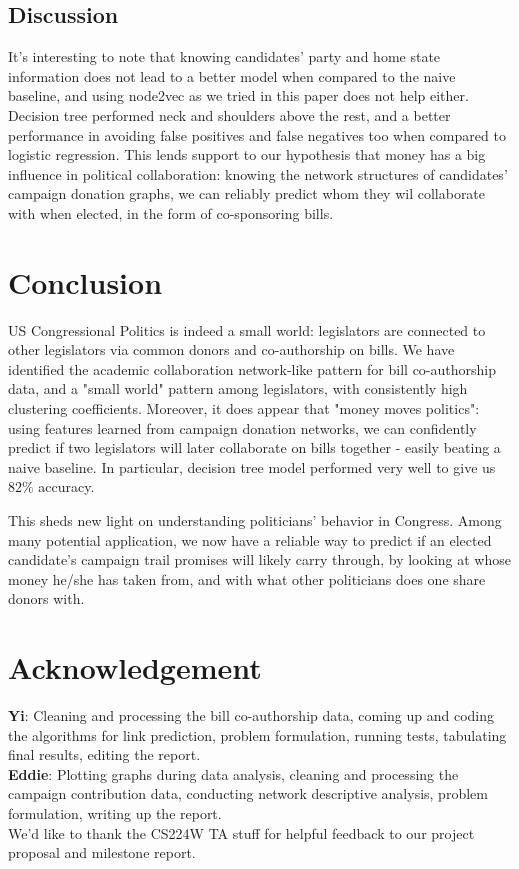 \documentclass[12pt,twocolumn]{article}
\begin{document}
\subsection{Discussion}
It's interesting to note that knowing candidates' party and home state information does not lead to a better model when compared to the naive baseline, and using node2vec as we tried in this paper does not help either. Decision tree performed neck and shoulders above the rest, and a better performance in avoiding false positives and false negatives too when compared to logistic regression. This lends support to our hypothesis that money has a big influence in political collaboration: knowing the network structures of candidates' campaign donation graphs, we can reliably predict whom they wil collaborate with when elected, in the form of co-sponsoring bills. 
\section{Conclusion}
US Congressional Politics is indeed a small world: legislators are connected to other legislators via common donors and co-authorship on bills. We have identified the academic collaboration network-like pattern for bill co-authorship data, and a "small world" pattern among legislators, with consistently high clustering coefficients. Moreover, it does appear that "money moves politics": using features learned from campaign donation networks, we can confidently predict if two legislators will later collaborate on bills together - easily beating a naive baseline. In particular, decision tree model performed very well to give us $82\%$ accuracy. 

This sheds new light on understanding politicians' behavior in Congress. Among many potential application, we now have a reliable way to predict if an elected candidate's campaign trail promises will likely carry through, by looking at whose money he/she has taken from, and with what other politicians does one share donors with. 

\section{Acknowledgement}
\textbf{Yi}: Cleaning and processing the bill co-authorship data, coming up and coding the algorithms for link prediction, problem formulation, running tests, tabulating final results, editing the report. \\
\textbf{Eddie}: Plotting graphs during data analysis, cleaning and processing the campaign contribution data, conducting network descriptive analysis, problem formulation, writing up the report. \\
We'd like to thank the CS224W TA stuff for helpful feedback to our project proposal and milestone report. 
\end{document}
